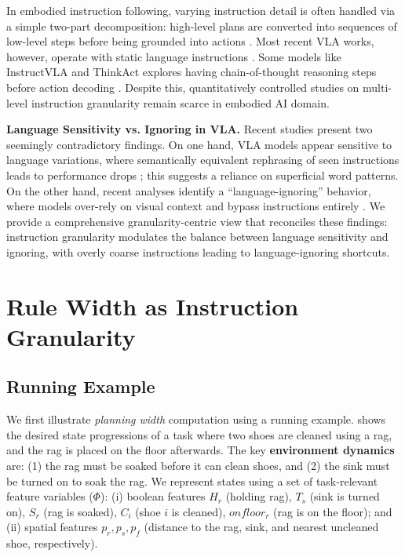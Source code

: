 \documentclass{article}
\begin{document}
In embodied instruction following, varying instruction detail is often handled via a simple two-part decomposition: high-level plans are converted into sequences of low-level steps before being grounded into actions \cite{DBLP:conf/wuwnet/Yang0H24,DBLP:conf/icml/ShiIEKPVTWWFLDG25}. Most recent VLA works, however, operate with static language instructions \cite{ma2025surveyvisionlanguageactionmodelsembodied,li2025cogvla}. Some models like InstructVLA and ThinkAct explores having chain-of-thought reasoning steps before action decoding \cite{yang2025instructvlavisionlanguageactioninstructiontuning,huang2025thinkactvisionlanguageactionreasoningreinforced}. Despite this, quantitatively controlled studies on multi-level instruction granularity remain scarce in embodied AI domain.

\noindent\textbf{Language Sensitivity vs. Ignoring in VLA.} 
Recent studies present two seemingly contradictory findings. On one hand, VLA models appear sensitive to language variations, where semantically equivalent rephrasing of seen instructions leads to performance drops \cite{akula-etal-2022-alfred,karnik2025embodiedredteamingauditing}; this suggests a reliance on superficial word patterns. On the other hand, recent analyses identify a ``language-ignoring'' behavior, where models over-rely on visual context and bypass instructions entirely \cite{xing2025shortcut,fei2025liberoplus,xu2025seeingactpromptingspecify}. We provide a comprehensive granularity-centric view that reconciles these findings: instruction granularity modulates the balance between language sensitivity and ignoring, with overly coarse instructions leading to language-ignoring shortcuts.



\section{Rule Width as Instruction Granularity}
\label{sec:granularity_as_width}

\subsection{Running Example}
\label{subsec:running_example_init}
We first illustrate \emph{planning width} computation using a running example.  shows the desired state progressions of a task where two shoes are cleaned using a rag, and the rag is placed on the floor afterwards. The key \textbf{environment dynamics} are: (1) the rag must be soaked before it can clean shoes, and (2) the sink must be turned on to soak the rag. We represent states using a set of task-relevant feature variables ($\Phi$): (i) boolean features $H_r$ (holding rag), $T_s$ (sink is turned on), $S_r$ (rag is soaked), $C_i$ (shoe $i$ is cleaned), $onfloor_r$ (rag is on the floor); and (ii) spatial features $p_r, p_s, p_f$ (distance to the rag, sink, and nearest uncleaned shoe, respectively).
\end{document}
